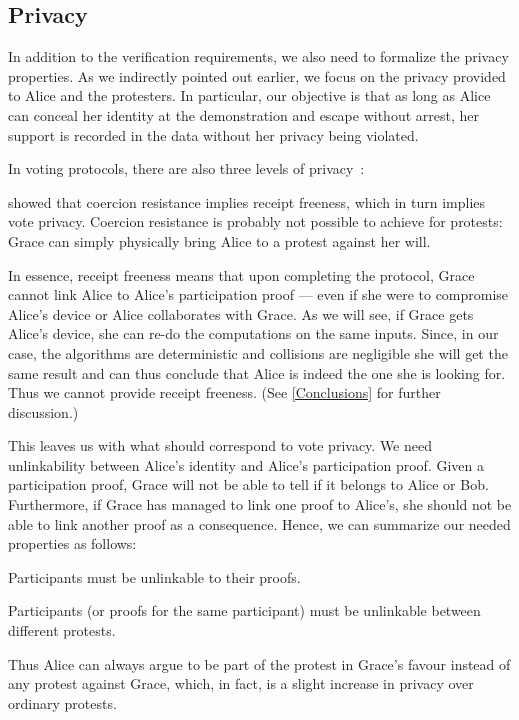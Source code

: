 \subsection{Privacy}%
\label{Privacy}

In addition to the verification requirements, we also need to formalize the privacy properties.
As we indirectly pointed out earlier, we focus on the privacy provided to Alice and the protesters.
In particular, our objective is that as long as Alice can conceal her identity 
at the demonstration and escape without arrest, her support is recorded in the 
data without her privacy being violated.

In voting protocols, there are also three levels of privacy~\cite{VerifyingPrivacyPropertiesOfVotingProtocols}:
 showed that coercion 
resistance implies receipt freeness, which in turn implies vote privacy.
Coercion resistance is probably not possible to achieve for protests:
\eg Grace can simply physically bring Alice to a protest against her will.

In essence, receipt freeness means that upon completing the protocol, Grace 
cannot link Alice to Alice's participation proof --- even if she were to 
compromise Alice's device or Alice collaborates with Grace.
As we will see, if Grace gets Alice's device, she can re-do the computations on 
the same inputs.
Since, in our case, the algorithms are deterministic and collisions are 
negligible she will get the same result and can thus conclude that Alice is 
indeed the one she is looking for.
Thus we cannot provide receipt freeness.
(See \cref{Conclusions} for further discussion.)

This leaves us with what should correspond to vote privacy.
We need unlinkability between Alice's identity and Alice's participation proof.
Given a participation proof, Grace will not be able to tell if it belongs to 
Alice or Bob.
Furthermore, if Grace has managed to link one proof to Alice's, she should not 
be able to link another proof as a consequence.
Hence, we can summarize our needed properties as follows:
\begin{requirements}[P]
\item\label{ProofUnlink} Participants must be unlinkable to their proofs.
\item\label{ProtestUnlink} Participants (or proofs for the same participant) 
  must be unlinkable between different protests.
\end{requirements}
Thus Alice can always argue to be part of the protest in Grace's favour instead 
of any protest against Grace, which, in fact, is a slight increase in privacy 
over ordinary protests.

